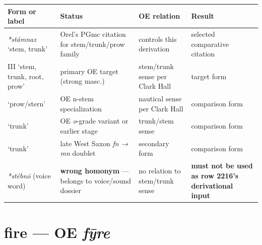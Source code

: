 \documentclass[
  british,
  a4paper,
  openany]{book}
\newcounter{none} %
\providecommand{\Recon}[1]{\emph{*#1}}
{\catcode`→=\active \global\def→{\ensuremath{\rightarrow}}}
\providecommand{\texorpdfstring}[2]{#1}
\providecommand{\Recon}[1]{\emph{*#1}}
{\catcode`→=\active \global\def→{\ensuremath{\rightarrow}}}
\begin{document}
{\def\LTcaptype{none} %
\begin{longtable}[]{@{}
  >{\raggedright\arraybackslash}p{}
  >{\raggedright\arraybackslash}p{}
  >{\raggedright\arraybackslash}p{}
  >{\raggedright\arraybackslash}p{}@{}}
\toprule\noalign{}
\begin{minipage}[b]{\linewidth}\raggedright
Form or label
\end{minipage} & \begin{minipage}[b]{\linewidth}\raggedright
Status
\end{minipage} & \begin{minipage}[b]{\linewidth}\raggedright
OE relation
\end{minipage} & \begin{minipage}[b]{\linewidth}\raggedright
Result
\end{minipage} \\
\midrule\noalign{}
\endhead
\bottomrule\noalign{}
\endlastfoot
\Recon{stámnaz} `stem, trunk' & Orel's PGmc citation for stem/trunk/prow
family & controls this derivation & selected comparative citation \\
{\emph{stefn}} III `stem, trunk, root, prow' & primary OE target (strong
masc.) & stem/trunk sense per Clark Hall & target form \\
{\emph{stefna}} `prow/stern' & OE n-stem specialization & nautical sense
per Clark Hall & comparison form \\
{\emph{stofn}} `trunk' & OE \emph{o}-grade variant or earlier stage &
trunk/stem sense & comparison form \\
{\emph{stemn}} `trunk' & late West Saxon \emph{fn → mn} doublet &
secondary form & comparison form \\
\emph{*stébnō} (voice word) & \textbf{wrong homonym} --- belongs to
voice/sound dossier & no relation to stem/trunk sense & \textbf{must not
be used as row 2216's derivational input} \\
\end{longtable}
}

\section{\texorpdfstring{fire --- OE
\emph{fȳre}}{fire --- OE fȳre}}\label{fire-oe-fux233re}

\end{document}
